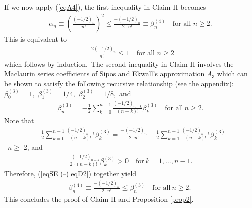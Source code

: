 \documentclass[final,oneeqnum]{siamltex}
\begin{document}
\noindent If we now apply (\ref{eqA4}),  the first inequality in
Claim II
becomes
\begin{eqnarray}
\alpha_{n}\equiv \left(\frac{(-1/2)_{n}}{n!}\right)^{2}\leq
\frac{-(-1/2)_{n}}{2\cdot n!}\equiv \beta^{(4)}_{n}\quad \mbox{for all $n\geq
2$.} \nonumber
\end{eqnarray} 
This is equivalent to
\begin{eqnarray}
\frac{-2(-1/2)_{n}}{n!}\leq  1\quad \mbox{for all $n\geq 2$}  \nonumber
\end{eqnarray} 
which follows by induction.\ The second inequality in Claim
II involves the
 Maclaurin series coefficients of Sipos and Ekwall's approximation $A_{3}$
 which can be shown to satisfy the following
recursive relationship (see the appendix):
$\beta^{(3)}_{0}=1,$ $\beta^{(3)}_{1}=1/4,$ $\beta^{(3)}_{2}=1/8,$ and
\begin{eqnarray}
\beta^{(3)}_{n} =
-\frac{1}{2}\sum_{k=0}^{n-1}\frac{(-1/2)_{n-k}}{(n-k)!}\beta^{(3)}_{k}
 \quad  \mbox{for all} \ n\geq 2.
\label{eqSE}
\end{eqnarray} 
Note that
\begin{eqnarray}
 -\frac{1}{2}\sum_{k=0}^{n-1}\frac{(-1/2)_{n-k}}{(n-k)!}\beta^{(3)}_{k} =
 \frac{-(-1/2)_{n}}{2\cdot
n!}-\frac{1}{2}\sum_{k=1}^{n-1}\frac{(-1/2)_{n-k}}{(n-k)!}\beta^{(3)}_{k}
  \label{eqDD}
\end{eqnarray} 
 \ $n \geq$ 2, and
\begin{eqnarray}
\frac{-(-1/2)_{n-k}}{2\cdot(n-k)!}\beta^{(3)}_{k} > 0 \quad
\mbox{for} \ k=1,\ldots,n-1.\ \label{eqD2}
\end{eqnarray} 
Therefore, (\ref{eqSE})--(\ref{eqD2}) together yield
\begin{eqnarray}
\beta^{(4)}_{n}\equiv\frac{-(-1/2)_{n}}{2\cdot n!}\leq  \beta^{(3)}_{n}
\quad \mbox{for all} \ n\geq 2.\ \nonumber
\end{eqnarray}
\noindent This concludes the proof of Claim II and Proposition \ref{prop2}.\,
\qquad\endproof%
\end{document}
